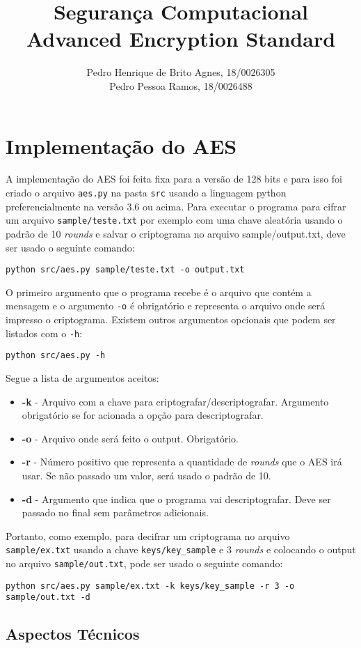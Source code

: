 \documentclass[12pt]{article}
\title{\textbf{Segurança Computacional\\ \Large{Advanced Encryption Standard}}}
\author{Pedro Henrique de Brito Agnes, 18/0026305 \\
Pedro Pessoa Ramos, 18/0026488}
\affil{Dep. Ciência da Computação - Universidade de Brasília (UnB) \vspace{-2ex}}
\date{}
\begin{document}
\maketitle

\section{Implementação do AES}
A implementação do AES foi feita fixa para a versão de 128 bits e para isso foi criado o arquivo \texttt{aes.py} na pasta \texttt{src} usando a linguagem python preferencialmente na versão 3.6 ou acima. Para executar o programa para cifrar um arquivo \texttt{sample/teste.txt} por exemplo com uma chave aleatória usando o padrão de 10 \textit{rounds} e salvar o criptograma no arquivo sample/output.txt, deve ser usado o seguinte comando:

\begin{lstlisting}
python src/aes.py sample/teste.txt -o output.txt
\end{lstlisting}

O primeiro argumento que o programa recebe é o arquivo que contém a mensagem e o argumento \texttt{-o} é obrigatório e representa o arquivo onde será impresso o criptograma. Existem outros argumentos opcionais que podem ser listados com o \texttt{-h}:

\begin{lstlisting}
python src/aes.py -h
\end{lstlisting}

Segue a lista de argumentos aceitos:
\begin{itemize}
    \item \textbf{-k} - Arquivo com a chave para criptografar/descriptografar. Argumento obrigatório se for acionada a opção para descriptografar.
    \item \textbf{-o} - Arquivo onde será feito o output. Obrigatório.
    \item \textbf{-r} - Número positivo que representa a quantidade de \textit{rounds} que o AES irá usar. Se não passado um valor, será usado o padrão de 10.
    \item \textbf{-d} - Argumento que indica que o programa vai descriptografar. Deve ser passado no final sem parâmetros adicionais.
\end{itemize}

Portanto, como exemplo, para decifrar um criptograma no arquivo \texttt{sample/ex.txt} usando a chave \texttt{keys/key\_sample} e 3 \textit{rounds} e colocando o output no arquivo \texttt{sample/out.txt}, pode ser usado o seguinte comando:

\begin{lstlisting}
python src/aes.py sample/ex.txt -k keys/key_sample -r 3 -o sample/out.txt -d
\end{lstlisting}

\subsection{Aspectos Técnicos}
\end{document}
